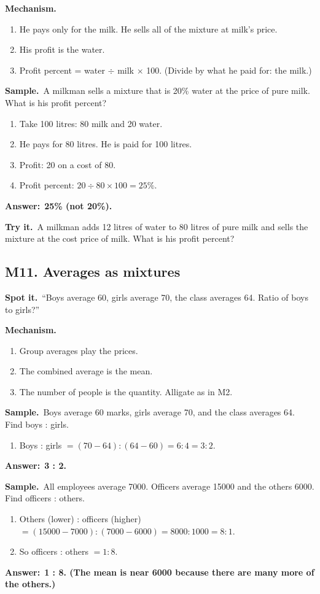 \documentclass[11pt,a4paper]{article}
\let\oldsubsection\subsection
\renewcommand{\subsection}{\needspace{9\baselineskip}\oldsubsection}
\newcommand{\spot}{\textbf{\color{ember}Spot it.}\ }
\newcommand{\mech}{\textbf{\color{ember}Mechanism.}\ }
\newif\ifkeepsamp
\newcommand{\ans}[1]{\par\nopagebreak\noindent\textbf{\color{ember}Answer:}\ \textbf{#1}\par}
\newcommand{\samp}{\ifkeepsamp\needspace{4\baselineskip}\fi\textbf{\color{ember}Sample.}\ }
\newcommand{\tryit}[1]{\textbf{\color{ember}Try it.}\ #1}
\begin{document}
\mech
\begin{enumerate}
\item He pays only for the milk. He sells all of the mixture at milk's price.
\item His profit is the water.
\item Profit percent = water $\div$ milk $\times$ 100. (Divide by what he paid for: the milk.)
\end{enumerate}

\samp A milkman sells a mixture that is 20\% water at the price of pure milk. What is his profit percent?
\begin{enumerate}
\item Take 100 litres: 80 milk and 20 water.
\item He pays for 80 litres. He is paid for 100 litres.
\item Profit: 20 on a cost of 80.
\item Profit percent: $20 \div 80 \times 100 = 25\%$.
\end{enumerate}
\ans{25\% (not 20\%).}

\tryit A milkman adds 12 litres of water to 80 litres of pure milk and sells the mixture at the cost price of milk. What is his profit percent?

\subsection{M11. Averages as mixtures}
\spot ``Boys average 60, girls average 70, the class averages 64. Ratio of boys to girls?''

\mech
\begin{enumerate}
\item Group averages play the prices.
\item The combined average is the mean.
\item The number of people is the quantity. Alligate as in M2.
\end{enumerate}

\samp Boys average 60 marks, girls average 70, and the class averages 64. Find boys : girls.
\begin{enumerate}
\item Boys : girls $= (70 - 64) : (64 - 60) = 6 : 4 = 3 : 2$.
\end{enumerate}
\ans{3 : 2.}

\samp All employees average 7000. Officers average 15000 and the others 6000. Find officers : others.
\begin{enumerate}
\item Others (lower) : officers (higher) $= (15000 - 7000) : (7000 - 6000) = 8000 : 1000 = 8 : 1$.
\item So officers : others $= 1 : 8$.
\end{enumerate}
\ans{1 : 8. (The mean is near 6000 because there are many more of the others.)}
\end{document}
